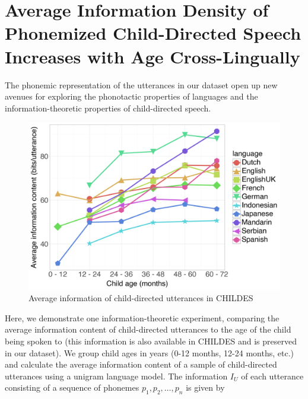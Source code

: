 \section{Average Information Density of Phonemized Child-Directed Speech Increases with Age Cross-Lingually}\label{app:13-:parentese}

The phonemic representation of the utterances in our dataset open up new avenues for exploring the phonotactic properties of languages and the information-theoretic properties of child-directed speech. %


\begin{figure}
    \centering
    \includegraphics[width=0.99\linewidth]{Figures/13Dataset/information-trends.png}
    \caption{Average information of child-directed utterances in CHILDES}
    \label{fig:13-information-trends}
\end{figure}

Here, we demonstrate one information-theoretic experiment, comparing the average information content of child-directed utterances to the age of the child being spoken to (this information is also available in CHILDES and is preserved in our dataset). We group child ages in years (0-12 months, 12-24 months, etc.) and calculate the average information content of a sample of child-directed utterances using a unigram language model. The information $I_U$ of each utterance consisting of a sequence of phonemes $p_1,p_2,\ldots,p_n$ is given by

